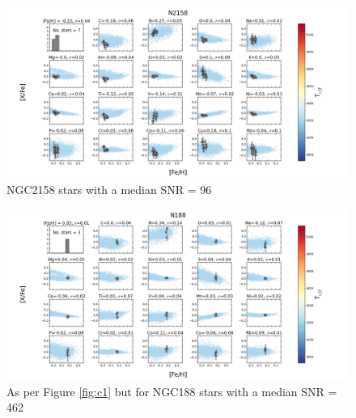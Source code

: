 \documentclass[14pt, preprint2]{aastex6}
\begin{document}
\begin{figure}
\centering
                     \includegraphics[scale=0.5]{20elem11_tc2_nofilt.png}
  \caption{ NGC2158 stars with a median SNR = 96  } %
\label{fig:c3}
\end{figure}

\begin{figure}
\centering
                 \includegraphics[scale=0.5]{20elem10_tc2_nofilt.png}
  \caption{As per Figure \ref{fig:c1} but for NGC188 stars with a median SNR = 462 } %
\label{fig:c4}
\end{figure}
\end{document}
